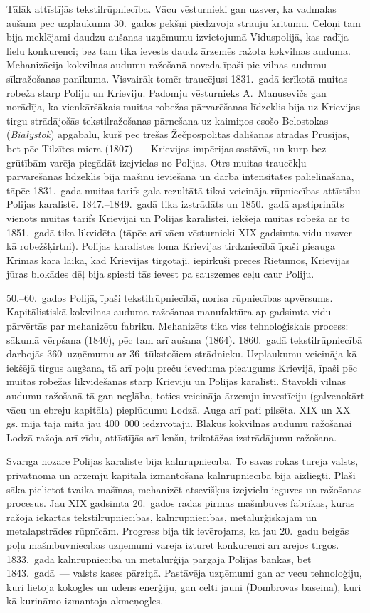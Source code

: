 \documentclass[twoside,a5paper,12pt,fleqn,openany]{extbook}
\newcommand{\pltxti}[1]{\textit{\textpolish{#1}}}
\begin{document}
Tālāk attīstījās tekstilrūpniecība. Vācu vēsturnieki gan uzsver, ka vadmalas aušana pēc uzplaukuma 30.~gados pēkšņi piedzīvoja strauju kritumu. Cēloņi tam bija meklējami daudzu aušanas uzņēmumu izvietojumā Viduspolijā, kas radīja lielu konkurenci; bez tam tika ievests daudz ārzemēs ražota kokvilnas auduma. Mehanizācija kokvilnas audumu ražošanā noveda īpaši pie vilnas audumu sīkražošanas panīkuma. Visvairāk tomēr traucējusi 1831.~gadā ierīkotā muitas robeža starp Poliju un Krieviju. Padomju vēsturnieks A.~Manusevičs gan norādīja, ka vienkāršākais muitas robežas pārvarēšanas līdzeklis bija uz Krievijas tirgu strādājošās tekstilražošanas pārnešana uz kaimiņos esošo Belostokas (\pltxti{Białystok}) apgabalu, kurš pēc trešās Žečpospolitas dalīšanas atradās Prūsijas, bet pēc Tilzītes miera (1807)~--- Krievijas impērijas sastāvā, un kurp bez grūtībām varēja piegādāt izejvielas no Polijas. Otrs muitas traucēkļu pārvarēšanas līdzeklis bija mašīnu ieviešana un darba intensitātes palielināšana, tāpēc 1831.~gada muitas tarifs gala rezultātā tikai veicināja rūpniecības attīstību Polijas karalistē. 1847.--1849.~gadā tika izstrādāts un 1850.~gadā apstiprināts vienots muitas tarifs Krievijai un Polijas karalistei, iekšējā muitas robeža ar to 1851.~gadā tika likvidēta (tāpēc arī vācu vēsturnieki XIX gadsimta vidu uzsver kā robežšķirtni). Polijas karalistes loma Krievijas tirdzniecībā īpaši pieauga Krimas kara laikā, kad Krievijas tirgotāji, iepirkuši preces Rietumos, Krievijas jūras blokādes dēļ bija spiesti tās ievest pa sauszemes ceļu caur Poliju.

50.--60.~gados Polijā, īpaši tekstilrūpniecībā, norisa rūpniecības apvērsums. Kapitālistiskā kokvilnas auduma ražošanas manufaktūra ap gadsimta vidu pārvērtās par mehanizētu fabriku. Mehanizēts tika viss tehnoloģiskais process: sākumā vērpšana (1840), pēc tam arī aušana (1864). 1860.~gadā tekstilrūpniecībā darbojās 360~uzņēmumu ar 36~tūkstošiem strādnieku. Uzplaukumu veicināja kā iekšējā tirgus augšana, tā arī poļu preču ieveduma pieaugums Krievijā, īpaši pēc muitas robežas likvidēšanas starp Krieviju un Polijas karalisti. Stāvokli vilnas audumu ražošanā tā gan neglāba, toties veicināja ārzemju investīciju (galvenokārt vācu un ebreju kapitāla) pieplūdumu Lodzā. Auga arī pati pilsēta. XIX un XX gs. mijā tajā mita jau 400~000 iedzīvotāju. Blakus kokvilnas audumu ražošanai Lodzā ražoja arī zīdu, attīstījās arī lenšu, trikotāžas izstrādājumu ražošana.

Svarīga nozare Polijas karalistē bija kalnrūpniecība. To savās rokās turēja valsts, privātnoma un ārzemju kapitāla izmantošana kalnrūpniecībā bija aizliegti. Plaši sāka pielietot tvaika mašīnas, mehanizēt atsevišķus izejvielu ieguves un ražošanas procesus. Jau XIX gadsimta 20.~gados radās pirmās mašīnbūves fabrikas, kurās ražoja iekārtas tekstilrūpniecības, kalnrūpniecības, metalurģiskajām un metalapstrādes rūpnīcām. Progress bija tik ievērojams, ka jau 20.~gadu beigās poļu mašīnbūvniecības uzņēmumi varēja izturēt konkurenci arī ārējos tirgos. 1833.~gadā kalnrūpniecība un metalurģija pārgāja Polijas bankas, bet 1843.~gadā~--- valsts kases pārziņā. Pastāvēja uzņēmumi gan ar vecu tehnoloģiju, kuri lietoja kokogles un ūdens enerģiju, gan celti jauni (Dombrovas baseinā), kuri kā kurināmo izmantoja akmeņogles.
\end{document}
